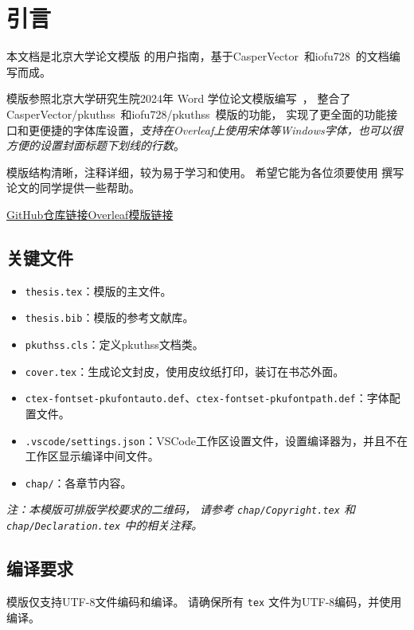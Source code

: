 \chapter{引言}
\label{chap:intro}

\def\GitHubLink{\href{https://github.com/zhiyunyao/pkuthss/tree/lite}{GitHub仓库链接}}
\def\OverleafLink{\href{https://www.overleaf.com/read/wmsmytgjkxfy\#c888f2}{Overleaf模版链接}}

本文档是北京大学论文模版 \pkuthss{} 的用户指南，基于CasperVector~\cite{casperpkuthss2011}和iofu728~\cite{iofu728pkuthss2021}的文档编写而成。

\pkuthss{}模版参照北京大学研究生院2024年 Word 学位论文模版编写~\cite{pku-thesisstyle,pku-degreetype}，
整合了CasperVector/pkuthss~\cite{casperpkuthss2011}和iofu728/pkuthss~\cite{iofu728pkuthss2021}模版的功能，
实现了更全面的功能接口和更便捷的字体库设置，\emph{支持在Overleaf上使用宋体等Windows字体，也可以很方便的设置封面标题下划线的行数}。

\pkuthss{}模版结构清晰，注释详细，较为易于学习和使用。
希望它能为各位须要使用  撰写论文的同学提供一些帮助。

\GitHubLink \quad \OverleafLink

\section{关键文件}
\begin{itemize}
    \item \verb|thesis.tex|：模版的主文件。
    \item \verb|thesis.bib|：模版的参考文献库。
    \item \verb|pkuthss.cls|：定义pkuthss文档类。
    \item \verb|cover.tex|：生成论文封皮，使用皮纹纸打印，装订在书芯外面。
    \item \verb|ctex-fontset-pkufontauto.def|、\verb|ctex-fontset-pkufontpath.def|：字体配置文件。
    \item \verb|.vscode/settings.json|：VSCode工作区设置文件，设置编译器为，并且不在工作区显示编译中间文件。
    \item \verb|chap/|：各章节内容。
\end{itemize}
\emph{
    注：本模版可排版学校要求的二维码，
    请参考 \texttt{chap/Copyright.tex} 和 \texttt{chap/Declaration.tex} 中的相关注释。
}

\section{编译要求}
\pkuthss{}模版仅支持UTF-8文件编码和编译。
请确保所有 \verb|tex| 文件为UTF-8编码，并使用编译。

